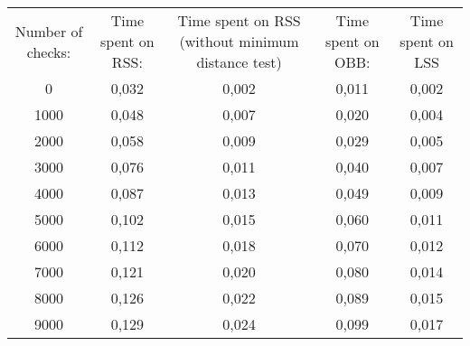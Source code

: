 \begin{tabular}{c|c|c|c|c}Number of checks: & Time spent on RSS: & Time spent on RSS (without minimum distance test) & Time spent on OBB: & Time spent on LSS\\ 
0 & 0,032 & 0,002 & 0,011 & 0,002\\ 
1000 & 0,048 & 0,007 & 0,020 & 0,004\\ 
2000 & 0,058 & 0,009 & 0,029 & 0,005\\ 
3000 & 0,076 & 0,011 & 0,040 & 0,007\\ 
4000 & 0,087 & 0,013 & 0,049 & 0,009\\ 
5000 & 0,102 & 0,015 & 0,060 & 0,011\\ 
6000 & 0,112 & 0,018 & 0,070 & 0,012\\ 
7000 & 0,121 & 0,020 & 0,080 & 0,014\\ 
8000 & 0,126 & 0,022 & 0,089 & 0,015\\ 
9000 & 0,129 & 0,024 & 0,099 & 0,017\\ 
\end{tabular}